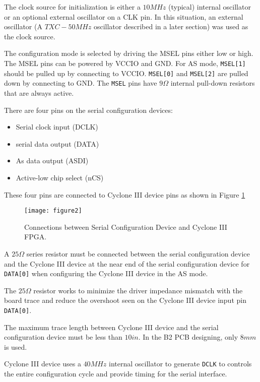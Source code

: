 The clock source for initialization is either a $10MHz$ (typical) internal oscillator or
an optional external oscillator on a CLK pin. In this situation, an external oscillator
(A $TXC-50MHz$ oscillator described in a later section) was used as the clock source.

The configuration mode is selected by driving the MSEL pins either low or high.
The MSEL pins can be powered by VCCIO and GND. For AS mode, \texttt{MSEL[1]} should be pulled up by connecting to VCCIO. \texttt{MSEL[0]} and \texttt{MSEL[2]} are pulled down by connecting to GND. The \texttt{MSEL} pins have $9\Omega$ internal pull-down resistors that are always active.



There are four pins on the serial configuration devices:
\begin{itemize}
 \item Serial clock input (DCLK)
 \item serial data output (DATA)
 \item As data output (ASDI)
 \item Active-low chip select (nCS)
\end{itemize}

These four pins are connected to Cyclone III device pins as shown in Figure \ref{fig:b2_f2}

\begin{figure}
 \centering
 \texttt{[image: figure2]}
 \caption{Connections between Serial Configuration Device and Cyclone III FPGA.}
 \label{fig:b2_f2}
\end{figure}

A $25\Omega$ series resistor must be connected between the serial configuration device and
the Cyclone III device at the near end of the serial configuration device for \texttt{DATA[0]}
when configuring the Cyclone III device in the AS mode.

The $25\Omega$ resistor works to minimize the driver impedance mismatch with the board trace
and reduce the overshoot seen on the Cyclone III device input pin \texttt{DATA[0]}.

The maximum trace length between Cyclone III device and the serial configuration device must be less than $10in$. In the B2 PCB designing, only $8mm$ is used.

Cyclone III device uses a $40MHz$ internal oscillator to generate \texttt{DCLK} to controls the entire configuration cycle and provide timing for the serial interface.

